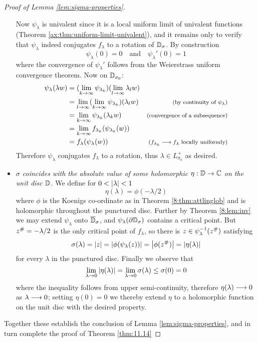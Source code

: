 \documentclass[../main.tex]{subfiles}
\begin{document}
\begin{proof}[Proof of Lemma \ref{lem:sigma-properties}]
\begin{itemize}
    Now $\psi_\lambda$ is univalent since it is a local uniform limit of univalent functions (Theorem \ref{ax:thm:uniform-limit-univalent}), and it remains only to verify that $\psi_\lambda$ indeed conjugates $f_\lambda$ to a rotation of $\mathbb{D}_\sigma$. By construction
    \[
    \psi_\lambda(0) = 0 \quad \text{and} \quad \psi_\lambda'(0) = 1
    \]
    where the convergence of $\psi_\lambda'$ follows from the Weierstrass uniform convergence theorem. Now on $\mathbb{D}_{\sigma_0}$:
    \begin{align*}
    \psi_\lambda(\lambda w)
    &= (\lim_{k \to \infty} \psi_{\lambda_k})(\lim_{l\to\infty} \lambda_l w)\\
    &= \lim_{l\to\infty} (\lim_{k \to \infty} \psi_{\lambda_k})(\lambda_l w)
    & \text{\footnotesize (by continuity of $\psi_\lambda$)}\\
    &= \lim_{k\to\infty} \psi_{\lambda_k}(\lambda_k w)
    & \text{\footnotesize (convergence of a subsequence)}\\
    &= \lim_{k \to \infty} f_{\lambda_k}(\psi_{\lambda_k}(w))\\
    & = f_\lambda(\psi_\lambda(w)) & \text{\footnotesize ($f_{\lambda_k} \longrightarrow f_\lambda$ locally uniformly)}
    \end{align*}
    Therefore $\psi_\lambda$ conjugates $f_\lambda$ to a rotation, thus $\lambda \in L_{\sigma_0}^+$ as desired.
    
    \item \textit{$\sigma$ coincides with the absolute value of some holomorphic $\eta : \mathbb{D} \to \mathbb{C}$ on the unit disc $\mathbb{D}$.} We define for $0 < \left|\lambda\right| < 1$
    \[
    \eta(\lambda) = \phi(-\lambda/2)
    \]
    where $\phi$ is the Koenigs co-ordinate as in Theorem \ref{8:thm:attlinglob} and is holomorphic throughout the punctured disc. Further by Theorem \ref{8:lem:inv} we may extend $\psi_\lambda$ onto $\overline{\mathbb{D}}_\sigma$, and $\psi_\lambda(\partial\mathbb{D}_{\sigma})$ contains a critical point. But $z^{\#} = -\lambda/2$ is the only critical point of $f_\lambda$, so there is $z \in \psi_\lambda^{-1}(z^{\#})$ satisfying
    \[
    \sigma(\lambda) = \left|z\right| = \left|\phi (\psi_\lambda (z))\right| = \left|\phi(z^{\#})\right| = \left|\eta(\lambda)\right|
    \]
    for every $\lambda$ in the punctured disc. Finally we observe that
    \[
        \lim_{\lambda\to0} \left|\eta(\lambda)\right| = \lim_{\lambda\to0} \sigma(\lambda) \le \sigma(0) = 0 
    \]
    where the inequality follows from upper semi-continuity, therefore $\eta(\lambda) \longrightarrow 0$ as $\lambda \longrightarrow 0$; setting $\eta(0) = 0$ we thereby extend $\eta$ to a holomorphic function on the unit disc with the desired property.
\end{itemize}
Together these establish the conclusion of Lemma \ref{lem:sigma-properties}, and in turn complete the proof of Theorem \ref{thm:11.14}
\end{proof}
\end{document}
